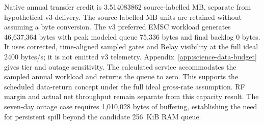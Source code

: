 Native annual transfer credit is 3.514083862 source-labelled MB, separate from hypothetical v3 delivery. The source-labelled MB units are retained without assuming a byte conversion. The v3 preferred EMSC workload generates 46,637,364 bytes with peak modeled queue 75,336 bytes and final backlog 0 bytes. It uses corrected, time-aligned sampled gates and Relay visibility at the full ideal 2400 bytes/s; it is not emitted v3 telemetry. Appendix~\ref{app:science-data-budget} gives tier and outage sensitivity.
The calculated service accommodates the sampled annual workload and returns the queue to zero. This supports the scheduled data-return concept under the full ideal gross-rate assumption. RF margin and actual net throughput remain separate from this capacity result. The seven-day outage case requires 1,010,028 bytes of buffering, establishing the need for persistent spill beyond the candidate 256~KiB RAM queue.
